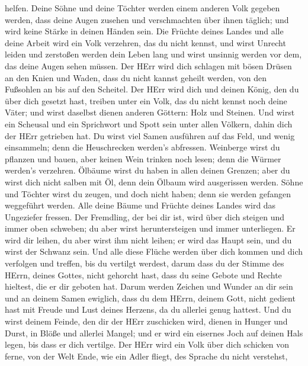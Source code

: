helfen.  Deine Söhne und deine Töchter werden einem anderen
Volk gegeben werden, dass deine Augen zusehen und verschmachten über
ihnen täglich; und wird keine Stärke in deinen Händen sein.
 Die Früchte deines Landes und alle deine Arbeit wird ein
Volk verzehren, das du nicht kennst, und wirst Unrecht leiden und
zerstoßen werden dein Leben lang  und wirst unsinnig werden
vor dem, das deine Augen sehen müssen.  Der HErr wird dich
schlagen mit bösen Drüsen an den Knien und Waden, dass du nicht kannst
geheilt werden, von den Fußsohlen an bis auf den Scheitel. 
Der HErr wird dich und deinen König, den du über dich gesetzt hast,
treiben unter ein Volk, das du nicht kennst noch deine Väter; und wirst
daselbst dienen anderen Göttern: Holz und Steinen.  Und
wirst ein Scheusal und ein Sprichwort und Spott sein unter allen
Völkern, dahin dich der HErr getrieben hat.  Du wirst viel
Samen ausführen auf das Feld, und wenig einsammeln; denn die
Heuschrecken werden's abfressen.  Weinberge wirst du
pflanzen und bauen, aber keinen Wein trinken noch lesen; denn die Würmer
werden's verzehren.  Ölbäume wirst du haben in allen deinen
Grenzen; aber du wirst dich nicht salben mit Öl, denn dein Ölbaum wird
ausgerissen werden.  Söhne und Töchter wirst du zeugen, und
doch nicht haben; denn sie werden gefangen weggeführt werden.
 Alle deine Bäume und Früchte deines Landes wird das
Ungeziefer fressen.  Der Fremdling, der bei dir ist, wird
über dich steigen und immer oben schweben; du aber wirst heruntersteigen
und immer unterliegen.  Er wird dir leihen, du aber wirst
ihm nicht leihen; er wird das Haupt sein, und du wirst der Schwanz sein.
 Und alle diese Flüche werden über dich kommen und dich
verfolgen und treffen, bis du vertilgt werdest, darum dass du der Stimme
des HErrn, deines Gottes, nicht gehorcht hast, dass du seine Gebote und
Rechte hieltest, die er dir geboten hat.  Darum werden
Zeichen und Wunder an dir sein und an deinem Samen ewiglich,
 dass du dem HErrn, deinem Gott, nicht gedient hast mit
Freude und Lust deines Herzens, da du allerlei genug hattest.
 Und du wirst deinem Feinde, den dir der HErr zuschicken
wird, dienen in Hunger und Durst, in Blöße und allerlei Mangel; und er
wird ein eisernes Joch auf deinen Hals legen, bis dass er dich vertilge.
 Der HErr wird ein Volk über dich schicken von ferne, von
der Welt Ende, wie ein Adler fliegt, des Sprache du nicht verstehst,
